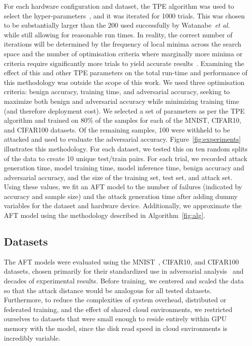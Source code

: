 \documentclass[conference]{IEEEtran}
\begin{document}
{For each hardware configuration and dataset, the TPE algorithm was used to select the hyper-parameters~\cite{ozaki2020multiobjective,zitzler2008quality}, and it was iterated for 1000 trials. This was chosen to be substantially larger than the 200 used successfully by Watanabe~\textit{et al.}~\cite{tpe_params} while still allowing for reasonable run times. In reality, the correct number of iterations will be determined by the frequency of local minima across the search space and the number of optimisation criteria where marginally more minima or criteria require significantly more trials to yield accurate results~\cite{legriel2010approximating}. Examining the effect of this and other TPE parameters on the total run-time and performance of this methodology was outside the scope of this work.
We used three optimisation criteria: benign accuracy, training time, and adversarial accuracy, seeking to maximize both benign and adversarial accuracy while minimizing training time (and therefore deployment cost). We selected a set of parameters as per the TPE algorithm and trained on 80\% of the samples for each of the MNIST, CIFAR10, and CIFAR100 datasets. Of the remaining samples, 100 were withheld to be attacked and used to evaluate the adversarial accuracy. Figure~\ref{fig:experiments} illustrates this methodology. For each dataset, we tested this on ten random splits of the data to create 10 unique test/train pairs. For each trial, we recorded attack generation time, model training time, model inference time, benign accuracy and adversarial accuracy, and the size of the training set, test set, and attack set. Using these values, we fit an AFT model to the number of failures (indicated by accuracy and sample size) and the attack generation time after adding dummy variables for the dataset and hardware device. Additionally, we approximate the AFT model using the methodology described in Algorithm~\ref{fig:alg}.


\subsection{Datasets}

The AFT models were evaluated using the MNIST~\cite{mnist}, CIFAR10\cite{cifar}, and CIFAR100\cite{cifar} datasets, chosen primarily for their standardized use in adversarial analysis~\cite{madry2017towards,croce_reliable_2020,carlini_towards_2017,deepfool} and decades of experimental results.
Before training, we centered and scaled the data so that the attack distance would be analogous for all tested datasets. Furthermore, to reduce the complexities of system overhead, distributed or federated training, and the effect of shared cloud environments, we restricted ourselves to datasets that were small enough to reside entirely within GPU memory with the model, since the disk read speed in cloud environments is incredibly variable.


}
\end{document}

